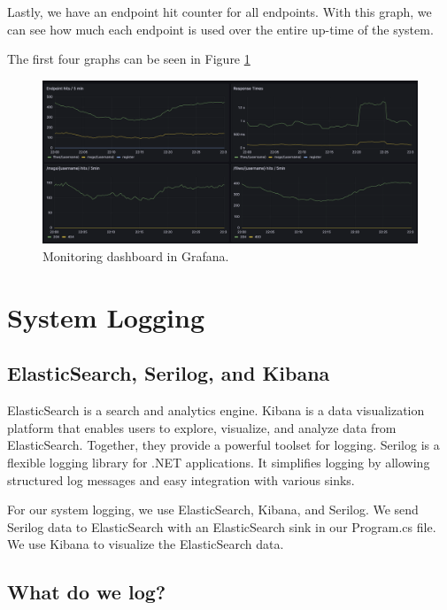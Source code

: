 Lastly, we have an endpoint hit counter for all endpoints. With this graph, we can see how much each endpoint is used over the entire up-time of the system.

The first four graphs can be seen in Figure \ref{fig:grafana}

\begin{figure}[h]
    \centering
    \includegraphics[width=1\textwidth]{images/grafana.png}
    \caption{Monitoring dashboard in Grafana.}
    \label{fig:grafana}
\end{figure}


\newpage
\section{System Logging}

\subsection{ElasticSearch, Serilog, and Kibana}

ElasticSearch is a search and analytics engine. Kibana is a data visualization platform that enables users to explore, visualize, and analyze data from ElasticSearch. Together, they provide a powerful toolset for logging.
Serilog is a flexible logging library for .NET applications. It simplifies logging by allowing structured log messages and easy integration with various sinks.

For our system logging, we use ElasticSearch, Kibana, and Serilog. We send Serilog data to ElasticSearch with an ElasticSearch sink in our Program.cs file. We use Kibana to visualize the ElasticSearch data.

\subsection{What do we log?}


